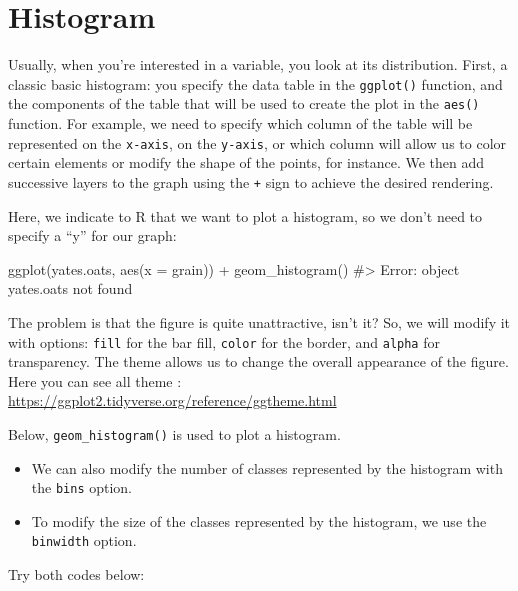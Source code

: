 \documentclass[
  letterpaper,
  DIV=11,
  numbers=noendperiod]{scrreprt}
\newenvironment{Shaded}{\begin{snugshade}}{\end{snugshade}}
\newcommand{\AttributeTok}[1]{\textcolor[rgb]{0.40,0.45,0.13}{#1}}
\newcommand{\CommentTok}[1]{\textcolor[rgb]{0.37,0.37,0.37}{#1}}
\newcommand{\FunctionTok}[1]{\textcolor[rgb]{0.28,0.35,0.67}{#1}}
\newcommand{\NormalTok}[1]{\textcolor[rgb]{0.00,0.23,0.31}{#1}}
\newcommand{\SpecialCharTok}[1]{\textcolor[rgb]{0.37,0.37,0.37}{#1}}
\begin{document}
\section{Histogram}\label{histogram-1}

Usually, when you're interested in a variable, you look at its
distribution. First, a classic basic histogram: you specify the data
table in the \texttt{ggplot()} function, and the components of the table
that will be used to create the plot in the \texttt{aes()} function. For
example, we need to specify which column of the table will be
represented on the \texttt{x-axis}, on the \texttt{y-axis}, or which
column will allow us to color certain elements or modify the shape of
the points, for instance. We then add successive layers to the graph
using the \texttt{+} sign to achieve the desired rendering.

Here, we indicate to R that we want to plot a histogram, so we don't
need to specify a ``y'' for our graph:

\begin{Shaded}
\begin{Highlighting}[]

\FunctionTok{ggplot}\NormalTok{(yates.oats, }\FunctionTok{aes}\NormalTok{(}\AttributeTok{x =}\NormalTok{ grain)) }\SpecialCharTok{+}
  \FunctionTok{geom\_histogram}\NormalTok{()}
\CommentTok{\#\textgreater{} Error: object \textquotesingle{}yates.oats\textquotesingle{} not found}
\end{Highlighting}
\end{Shaded}

The problem is that the figure is quite unattractive, isn't it? So, we
will modify it with options: \texttt{fill} for the bar fill,
\texttt{color} for the border, and \texttt{alpha} for transparency. The
theme allows us to change the overall appearance of the figure. Here you
can see all theme :
\url{https://ggplot2.tidyverse.org/reference/ggtheme.html}

Below, \texttt{geom\_histogram()} is used to plot a histogram.

\begin{itemize}
\item
  We can also modify the number of classes represented by the histogram
  with the \texttt{bins} option.
\item
  To modify the size of the classes represented by the histogram, we use
  the \texttt{binwidth} option.
\end{itemize}

Try both codes below:
\end{document}

